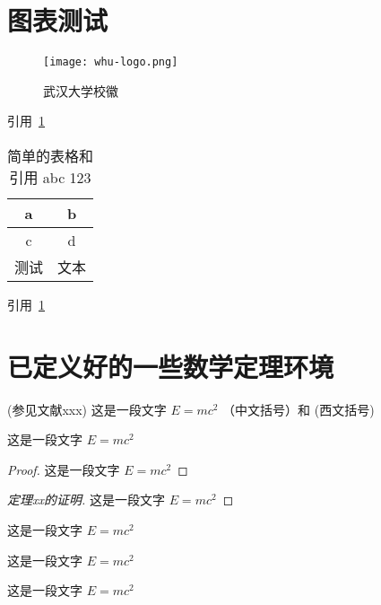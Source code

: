 \documentclass[type = doctor]{whu-thesis}
\begin{document}
\section{图表测试}

\begin{figure}[ht]
  \centering
  \texttt{[image: whu-logo.png]}
  \caption{武汉大学校徽}
  \label{fig:武汉大学校徽}
\end{figure}

引用~\ref{fig:武汉大学校徽}

\begin{table}[ht]
  \centering
  \caption{简单的表格和引用 abc 123 \cite{whu-bachelor:1}}
  \label{table:简单的表格}
  \begin{tabular}{cc}
    \hline
    a & b \\\hline
    c & d \\\hline
    测试 & 文本 \\\hline
  \end{tabular}
\end{table}

引用~\ref{table:简单的表格}


\section{已定义好的一些数学定理环境}


\begin{definition}[测度]
  (参见文献xxx) 这是一段文字 $E = m c^2$  （中文括号）和 (西文括号)
\end{definition}

\begin{theorem}
  这是一段文字 $E = m c^2$
\end{theorem}


\begin{proof}
  这是一段文字 $E = m c^2$
\end{proof}

\begin{proof}[定理xx的证明]
  这是一段文字 $E = m c^2$
\end{proof}

\begin{example}
  这是一段文字 $E = m c^2$
\end{example}

\begin{property}
  这是一段文字 $E = m c^2$
\end{property}

\begin{proposition}
  这是一段文字 $E = m c^2$
\end{proposition}
\end{document}
